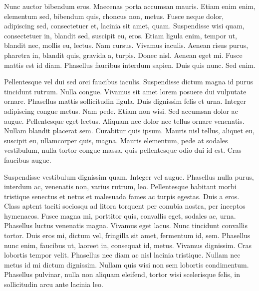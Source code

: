 Nunc auctor bibendum eros. Maecenas porta accumsan mauris. Etiam enim enim, elementum sed, bibendum quis, rhoncus non, metus. Fusce neque dolor, adipiscing sed, consectetuer et, lacinia sit amet, quam. Suspendisse wisi quam, consectetuer in, blandit sed, suscipit eu, eros. Etiam ligula enim, tempor ut, blandit nec, mollis eu, lectus. Nam cursus. Vivamus iaculis. Aenean risus purus, pharetra in, blandit quis, gravida a, turpis. Donec nisl. Aenean eget mi. Fusce mattis est id diam. Phasellus faucibus interdum sapien. Duis quis nunc. Sed enim.

Pellentesque vel dui sed orci faucibus iaculis. Suspendisse dictum magna id purus tincidunt rutrum. Nulla congue. Vivamus sit amet lorem posuere dui vulputate ornare. Phasellus mattis sollicitudin ligula. Duis dignissim felis et urna. Integer adipiscing congue metus. Nam pede. Etiam non wisi. Sed accumsan dolor ac augue. Pellentesque eget lectus. Aliquam nec dolor nec tellus ornare venenatis. Nullam blandit placerat sem. Curabitur quis ipsum. Mauris nisl tellus, aliquet eu, suscipit eu, ullamcorper quis, magna. Mauris elementum, pede at sodales vestibulum, nulla tortor congue massa, quis pellentesque odio dui id est. Cras faucibus augue.


Suspendisse vestibulum dignissim quam. Integer vel augue. Phasellus nulla purus, interdum ac, venenatis non, varius rutrum, leo. Pellentesque habitant morbi tristique senectus et netus et malesuada fames ac turpis egestas. Duis a eros. Class aptent taciti sociosqu ad litora torquent per conubia nostra, per inceptos hymenaeos. Fusce magna mi, porttitor quis, convallis eget, sodales ac, urna. Phasellus luctus venenatis magna. Vivamus eget lacus. Nunc tincidunt convallis tortor. Duis eros mi, dictum vel, fringilla sit amet, fermentum id, sem. Phasellus nunc enim, faucibus ut, laoreet in, consequat id, metus. Vivamus dignissim. Cras lobortis tempor velit. Phasellus nec diam ac nisl lacinia tristique. Nullam nec metus id mi dictum dignissim. Nullam quis wisi non sem lobortis condimentum. Phasellus pulvinar, nulla non aliquam eleifend, tortor wisi scelerisque felis, in sollicitudin arcu ante lacinia leo.

